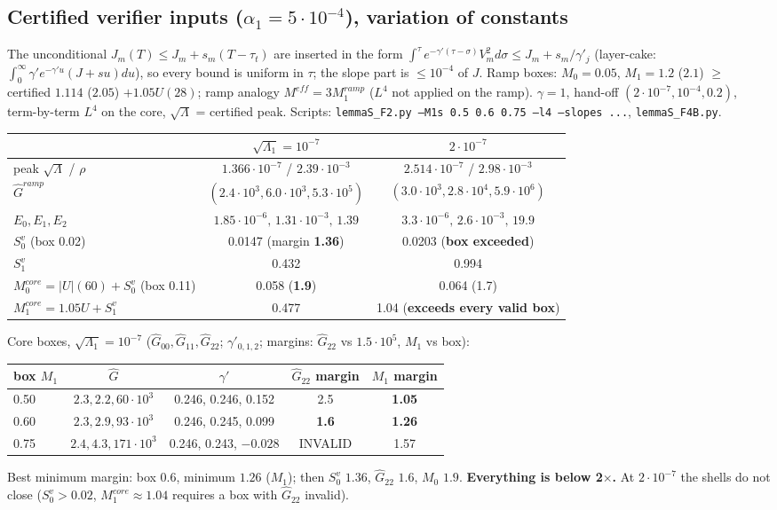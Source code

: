 \documentclass[11pt]{article}
\begin{document}
\subsection*{Certified verifier inputs ($\alpha_1=5\cdot10^{-4}$), variation of constants}
The unconditional $J_m(T)\le J_m+s_m(T-\tau_t)$ are inserted in the form $\int^\tau e^{-\gamma'(\tau-\sigma)}V_m^2d\sigma\le J_m+s_m/\gamma'_j$ (layer-cake: $\int_0^\infty\gamma'e^{-\gamma'u}(J+su)du$), so every bound is uniform in $\tau$; the slope part is $\le10^{-4}$ of $J$. Ramp boxes: $M_0=0.05$, $M_1=1.2$ ($2.1$) $\ge$ certified $1.114$ ($2.05$) $+1.05U(28)$; ramp analogy $M^{eff}=3M_1^{ramp}$ ($L^4$ not applied on the ramp). $\gamma=1$, hand-off $(2\cdot10^{-7},10^{-4},0.2)$, term-by-term $L^4$ on the core, $\sqrt\Lambda$ = certified peak. Scripts: \texttt{lemmaS\_F2.py --M1s 0.5 0.6 0.75 --l4 --slopes ...}, \texttt{lemmaS\_F4B.py}.

\begin{center}\small\begin{tabular}{lcc}
 & $\sqrt{\Lambda_1}=10^{-7}$ & $2\cdot10^{-7}$\\\hline
peak $\sqrt\Lambda$ / $\rho$ & $1.366\cdot10^{-7}$ / $2.39\cdot10^{-3}$ & $2.514\cdot10^{-7}$ / $2.98\cdot10^{-3}$\\
$\hat G^{ramp}$ & $(2.4\cdot10^3,6.0\cdot10^3,5.3\cdot10^5)$ & $(3.0\cdot10^3,2.8\cdot10^4,5.9\cdot10^6)$\\
$E_0,E_1,E_2$ & $1.85\cdot10^{-6},\,1.31\cdot10^{-3},\,1.39$ & $3.3\cdot10^{-6},\,2.6\cdot10^{-3},\,19.9$\\
$S_0^v$ (box 0.02) & 0.0147 (margin \textbf{1.36}) & 0.0203 (\textbf{box exceeded})\\
$S_1^v$ & 0.432 & 0.994\\
$M_0^{core}=|U|(60)+S_0^v$ (box 0.11) & 0.058 (\textbf{1.9}) & 0.064 (1.7)\\
$M_1^{core}=1.05U+S_1^v$ & 0.477 & 1.04 (\textbf{exceeds every valid box})\\
\end{tabular}\end{center}
Core boxes, $\sqrt{\Lambda_1}=10^{-7}$ ($\hat G_{00},\hat G_{11},\hat G_{22}$; $\gamma'_{0,1,2}$; margins: $\hat G_{22}$ vs $1.5\cdot10^5$, $M_1$ vs box):
\begin{center}\small\begin{tabular}{lcccc}
box $M_1$ & $\hat G$ & $\gamma'$ & $\hat G_{22}$ margin & $M_1$ margin\\\hline
0.50 & $2.3,2.2,60\cdot10^3$ & 0.246, 0.246, 0.152 & 2.5 & \textbf{1.05}\\
0.60 & $2.3,2.9,93\cdot10^3$ & 0.246, 0.245, 0.099 & \textbf{1.6} & \textbf{1.26}\\
0.75 & $2.4,4.3,171\cdot10^3$ & 0.246, 0.243, $-0.028$ & INVALID & 1.57
\end{tabular}\end{center}
Best minimum margin: box $0.6$, minimum $1.26$ ($M_1$); then $S_0^v$ $1.36$, $\hat G_{22}$ $1.6$, $M_0$ $1.9$. \textbf{Everything is below 2$\times$.} At $2\cdot10^{-7}$ the shells do not close ($S_0^v>0.02$, $M_1^{core}\approx1.04$ requires a box with $\hat G_{22}$ invalid).
\end{document}
